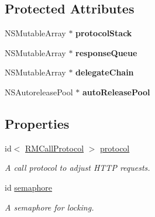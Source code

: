 \subsection*{Protected Attributes}
\begin{DoxyCompactItemize}
\item 
\hypertarget{interface_r_m_call_af082e641c263aa410c5195084153e03b}{
NSMutableArray $\ast$ {\bfseries protocolStack}}
\label{interface_r_m_call_af082e641c263aa410c5195084153e03b}

\item 
\hypertarget{interface_r_m_call_ab5d202e25515a602bac16ab028336a89}{
NSMutableArray $\ast$ {\bfseries responseQueue}}
\label{interface_r_m_call_ab5d202e25515a602bac16ab028336a89}

\item 
\hypertarget{interface_r_m_call_a7ee402fc72181667a1dee30f83d41ddf}{
NSMutableArray $\ast$ {\bfseries delegateChain}}
\label{interface_r_m_call_a7ee402fc72181667a1dee30f83d41ddf}

\item 
\hypertarget{interface_r_m_call_a98a195cf89cf282dc613f6573c238d2d}{
NSAutoreleasePool $\ast$ {\bfseries autoReleasePool}}
\label{interface_r_m_call_a98a195cf89cf282dc613f6573c238d2d}

\end{DoxyCompactItemize}
\subsection*{Properties}
\begin{DoxyCompactItemize}
\item 
\hypertarget{interface_r_m_call_ae96906f15a63ea2680d57eccef568944}{
id$<$ \hyperlink{protocol_r_m_call_protocol-p}{RMCallProtocol} $>$ \hyperlink{interface_r_m_call_ae96906f15a63ea2680d57eccef568944}{protocol}}
\label{interface_r_m_call_ae96906f15a63ea2680d57eccef568944}

\begin{DoxyCompactList}\small\item\em A call protocol to adjust HTTP requests. \item\end{DoxyCompactList}\item 
\hypertarget{interface_r_m_call_a4745f7b9f19769c2c0d4777515d979ad}{
id \hyperlink{interface_r_m_call_a4745f7b9f19769c2c0d4777515d979ad}{semaphore}}
\label{interface_r_m_call_a4745f7b9f19769c2c0d4777515d979ad}

\begin{DoxyCompactList}\small\item\em A semaphore for locking. \item\end{DoxyCompactList}\end{DoxyCompactItemize}


